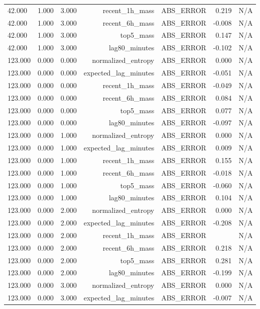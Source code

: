 \begin{table}[h!]
\begin{tabular}{lrrrrrr}
42.000 & 1.000 & 3.000 & recent\_1h\_mass & ABS\_ERROR & 0.219 & N/A \\
42.000 & 1.000 & 3.000 & recent\_6h\_mass & ABS\_ERROR & -0.008 & N/A \\
42.000 & 1.000 & 3.000 & top5\_mass & ABS\_ERROR & 0.147 & N/A \\
42.000 & 1.000 & 3.000 & lag80\_minutes & ABS\_ERROR & -0.102 & N/A \\
123.000 & 0.000 & 0.000 & normalized\_entropy & ABS\_ERROR & 0.000 & N/A \\
123.000 & 0.000 & 0.000 & expected\_lag\_minutes & ABS\_ERROR & -0.051 & N/A \\
123.000 & 0.000 & 0.000 & recent\_1h\_mass & ABS\_ERROR & -0.049 & N/A \\
123.000 & 0.000 & 0.000 & recent\_6h\_mass & ABS\_ERROR & 0.084 & N/A \\
123.000 & 0.000 & 0.000 & top5\_mass & ABS\_ERROR & 0.077 & N/A \\
123.000 & 0.000 & 0.000 & lag80\_minutes & ABS\_ERROR & -0.097 & N/A \\
123.000 & 0.000 & 1.000 & normalized\_entropy & ABS\_ERROR & 0.000 & N/A \\
123.000 & 0.000 & 1.000 & expected\_lag\_minutes & ABS\_ERROR & 0.009 & N/A \\
123.000 & 0.000 & 1.000 & recent\_1h\_mass & ABS\_ERROR & 0.155 & N/A \\
123.000 & 0.000 & 1.000 & recent\_6h\_mass & ABS\_ERROR & -0.018 & N/A \\
123.000 & 0.000 & 1.000 & top5\_mass & ABS\_ERROR & -0.060 & N/A \\
123.000 & 0.000 & 1.000 & lag80\_minutes & ABS\_ERROR & 0.104 & N/A \\
123.000 & 0.000 & 2.000 & normalized\_entropy & ABS\_ERROR & 0.000 & N/A \\
123.000 & 0.000 & 2.000 & expected\_lag\_minutes & ABS\_ERROR & -0.208 & N/A \\
123.000 & 0.000 & 2.000 & recent\_1h\_mass & ABS\_ERROR &  & N/A \\
123.000 & 0.000 & 2.000 & recent\_6h\_mass & ABS\_ERROR & 0.218 & N/A \\
123.000 & 0.000 & 2.000 & top5\_mass & ABS\_ERROR & 0.281 & N/A \\
123.000 & 0.000 & 2.000 & lag80\_minutes & ABS\_ERROR & -0.199 & N/A \\
123.000 & 0.000 & 3.000 & normalized\_entropy & ABS\_ERROR & 0.000 & N/A \\
123.000 & 0.000 & 3.000 & expected\_lag\_minutes & ABS\_ERROR & -0.007 & N/A \\

\end{tabular}
\end{table}
